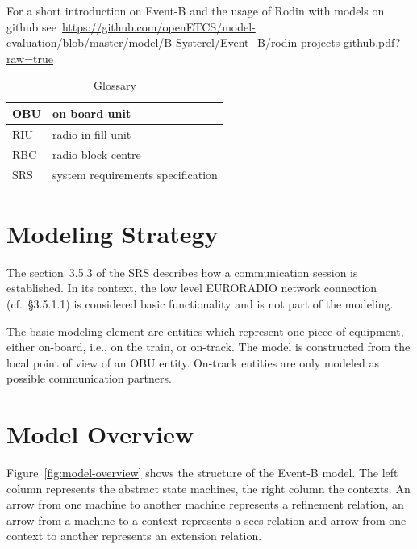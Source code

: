 \documentclass{template/openetcs_article}
\begin{document}
For a short introduction on Event-B and the usage of Rodin with models on github
see~\url{https://github.com/openETCS/model-evaluation/blob/master/model/B-Systerel/Event_B/rodin-projects-github.pdf?raw=true}

\begin{table}[ht]
  \centering
  \begin{tabular}[ht]{|l|l|}
    \hline
    OBU & on board unit \\
    \hline
    RIU & radio in-fill unit \\
    \hline
    RBC & radio block centre \\
    \hline
    SRS & system requirements specification \\
    \hline
  \end{tabular}
  \caption{Glossary}
  \label{tab:glossary}
\end{table}

\section{Modeling Strategy}
\label{sec:modeling-strategy}

The section~3.5.3 of the SRS describes how a communication session is
established. In its context, the low level EURORADIO network connection
(cf.~§3.5.1.1) is considered basic functionality and is not part of the
modeling.

The basic modeling element are entities which represent one piece of equipment,
either on-board, i.e., on the train, or on-track. The model is constructed from
the local point of view of an OBU entity. On-track entities are only modeled as
possible communication partners.

\section{Model Overview}
\label{sec:model-overview}

Figure~\ref{fig:model-overview} shows the structure of the Event-B model. The
left column represents the abstract state machines, the right column the
contexts. An arrow from one machine to another machine represents a refinement
relation, an arrow from a machine to a context represents a sees relation and
arrow from one context to another represents an extension relation.
\end{document}
